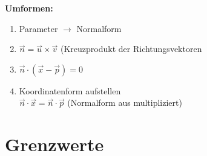 \documentclass[german]{latex4ei/latex4ei_sheet}
\begin{document}
\begin{sectionbox}
\textbf{Umformen:}
\begin{enumerate}
	\item Parameter $\rightarrow$ Normalform
	\item $\overrightarrow{n} = \overrightarrow{u} \times \overrightarrow{v}$ (Kreuzprodukt der Richtungsvektoren 
	\item $\overrightarrow{n} \cdot \left( \overrightarrow{x} - \overrightarrow{p} \right) = 0 $
	\item Koordinatenform aufstellen \\
	$\overrightarrow{n} \cdot \overrightarrow{x} = \overrightarrow{n} \cdot \overrightarrow{p}$
	(Normalform aus multipliziert)
\end{enumerate}


\end{sectionbox}


\section{Grenzwerte}
\end{document}
